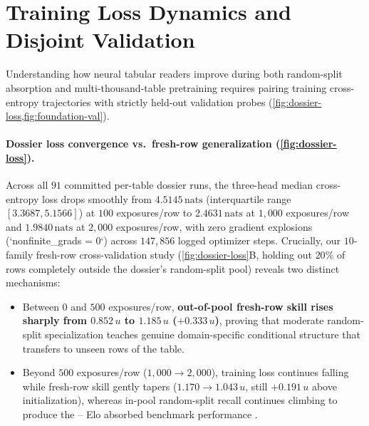 \section{Training Loss Dynamics and Disjoint Validation}
\label{sec:dynamics}




Understanding how neural tabular readers improve during both random-split absorption and multi-thousand-table pretraining requires pairing training cross-entropy trajectories with strictly held-out validation probes (\cref{fig:dossier-loss,fig:foundation-val}).

\paragraph{Dossier loss convergence vs.\ fresh-row generalization (\cref{fig:dossier-loss}).}
Across all $91$ committed  per-table dossier runs, the three-head median cross-entropy loss drops smoothly from $4.5145\,\text{nats}$ (interquartile range $[3.3687, 5.1566]$) at $100$ exposures/row to $2.4631\,\text{nats}$ at $1{,}000$ exposures/row and $1.9840\,\text{nats}$ at $2{,}000$ exposures/row, with zero gradient explosions (`nonfinite\_grads = 0`) across $147{,}856$ logged optimizer steps. Crucially, our $10$-family fresh-row cross-validation study (\cref{fig:dossier-loss}B, holding out $20\%$ of rows completely outside the dossier's random-split pool) reveals two distinct mechanisms:
\begin{itemize}
  \item Between $0$ and $500$ exposures/row, \textbf{out-of-pool fresh-row skill rises sharply from $0.852\,u$ to $1.185\,u$ ($+0.333\,u$)}, proving that moderate random-split specialization teaches genuine domain-specific conditional structure that transfers to unseen rows of the table.
  \item Beyond $500$ exposures/row ($1{,}000 \to 2{,}000$), training loss continues falling while fresh-row skill gently tapers ($1.170 \to 1.043\,u$, still $+0.191\,u$ above initialization), whereas in-pool random-split recall continues climbing to produce the \BHEloRecall{}--\BHEloGenTwoA{} Elo absorbed benchmark performance \est{}.
\end{itemize}

